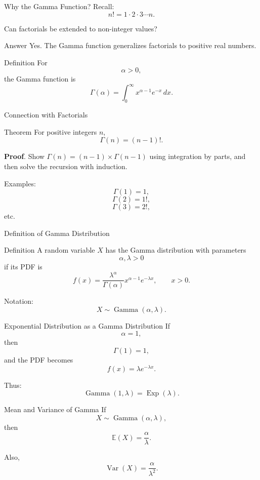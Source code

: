
\begin{frame}{Why the Gamma Function?}
Recall:
\[
n!
=
1\cdot2\cdot3\cdots n.
\]

Can factorials be extended to non-integer values?

\vspace{0.25cm}

\begin{keybox}{Answer}
Yes. The Gamma function generalizes factorials to positive real numbers.
\end{keybox}

\begin{keybox}{Definition}
For
\[
\alpha>0,
\]
the Gamma function is
\[
{
\Gamma(\alpha)
=
\int_0^\infty
x^{\alpha-1}e^{-x}\,dx.
}
\]
\end{keybox}
\end{frame}



\begin{frame}{Connection with Factorials}
\begin{keybox}{Theorem}
For positive integers $n$,
\[
\boxed{
\Gamma(n)=(n-1)!.
}
\]
\end{keybox}

\textbf{Proof}. Show $\Gamma(n)=(n-1)\times \Gamma(n-1)$ using integration by parts, and then solve the recursion with induction.


Examples:
\[
\Gamma(1)=1,
\]
\[
\Gamma(2)=1!,
\]
\[
\Gamma(3)=2!,
\]
etc.

\end{frame}




\begin{frame}{Definition of Gamma Distribution}
\begin{keybox}{Definition}
A random variable $X$ has the Gamma distribution with parameters
\[
\alpha,\lambda>0
\]
if its PDF is
\[
{
f(x)
=
\frac{
\lambda^\alpha
}{
\Gamma(\alpha)
}
x^{\alpha-1}e^{-\lambda x},
\qquad x>0.
}
\]

Notation:
\[
X\sim \operatorname{Gamma}(\alpha,\lambda).
\]
\end{keybox}
\end{frame}

\begin{frame}{Exponential Distribution as a Gamma Distribution}
If
\[
\alpha=1,
\]
then
\[
\Gamma(1)=1,
\]
and the PDF becomes
\[
f(x)=\lambda e^{-\lambda x}.
\]

Thus:
\[
{
\operatorname{Gamma}(1,\lambda)
=
\operatorname{Exp}(\lambda).
}
\]
\end{frame}
\begin{frame}{Mean and Variance of Gamma}
If
\[
X\sim \operatorname{Gamma}(\alpha,\lambda),
\]
then
\[
\mathbb{E}(X)=\frac{\alpha}{\lambda}.
\]

Also,
\[
\operatorname{Var}(X)=\frac{\alpha}{\lambda^2}.
\]
\end{frame}



